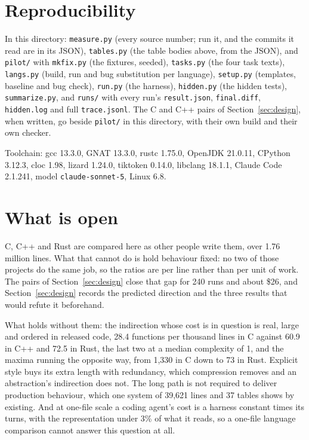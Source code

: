 \documentclass[11pt,a4paper]{article}
\begin{document}
\section{Reproducibility}

In this directory: \texttt{measure.py} (every source number; run it, and the commits it read are in its JSON), \texttt{tables.py} (the table bodies above, from the JSON), and \texttt{pilot/} with \texttt{mkfix.py} (the fixtures, seeded), \texttt{tasks.py} (the four task texts), \texttt{langs.py} (build, run and bug substitution per language), \texttt{setup.py} (templates, baseline and bug check), \texttt{run.py} (the harness), \texttt{hidden.py} (the hidden tests), \texttt{summarize.py}, and \texttt{runs/} with every run's \texttt{result.json}, \texttt{final.diff}, \texttt{hidden.log} and full \texttt{trace.jsonl}. The C and C++ pairs of Section~\ref{sec:design}, when written, go beside \texttt{pilot/} in this directory, with their own build and their own checker.

Toolchain: gcc 13.3.0, GNAT 13.3.0, rustc 1.75.0, OpenJDK 21.0.11, CPython 3.12.3, cloc 1.98, lizard 1.24.0, tiktoken 0.14.0, libclang 18.1.1, Claude Code 2.1.241, model \texttt{claude-sonnet-5}, Linux 6.8.

\section{What is open}

C, C++ and Rust are compared here as other people write them, over 1.76 million lines. What that cannot do is hold behaviour fixed: no two of those projects do the same job, so the ratios are per line rather than per unit of work. The pairs of Section~\ref{sec:design} close that gap for 240 runs and about \$26, and Section~\ref{sec:design} records the predicted direction and the three results that would refute it beforehand.

What holds without them: the indirection whose cost is in question is real, large and ordered in released code, 28.4 functions per thousand lines in C against 60.9 in C++ and 72.5 in Rust, the last two at a median complexity of 1, and the maxima running the opposite way, from 1,330 in C down to 73 in Rust. Explicit style buys its extra length with redundancy, which compression removes and an abstraction's indirection does not. The long path is not required to deliver production behaviour, which one system of 39,621 lines and 37 tables shows by existing. And at one-file scale a coding agent's cost is a harness constant times its turns, with the representation under 3\% of what it reads, so a one-file language comparison cannot answer this question at all.
\end{document}

